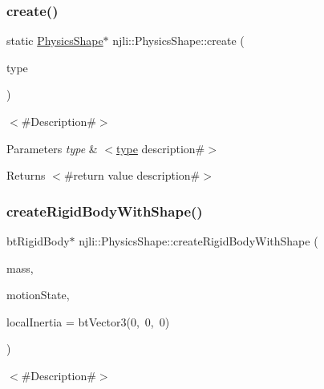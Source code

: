 \subsubsection{\texorpdfstring{create()}{create()}\hspace{0.1cm}{\footnotesize\ttfamily [2/2]}}
{\footnotesize\ttfamily static \mbox{\hyperlink{classnjli_1_1_physics_shape}{Physics\+Shape}}$\ast$ njli\+::\+Physics\+Shape\+::create (\begin{DoxyParamCaption}\item[{\mbox{\hyperlink{_util_8h_a10e94b422ef0c20dcdec20d31a1f5049}{u32}}}]{type }\end{DoxyParamCaption})\hspace{0.3cm}{\ttfamily [static]}}

$<$\#\+Description\#$>$


\begin{DoxyParams}{Parameters}
{\em type} & $<$\mbox{\hyperlink{classnjli_1_1_physics_shape_a2d21f55f6e742bddb5b5fc44223f96fb}{type}} description\#$>$\\
\hline
\end{DoxyParams}
\begin{DoxyReturn}{Returns}
$<$\#return value description\#$>$ 
\end{DoxyReturn}
\mbox{\label{classnjli_1_1_physics_shape_ab71ebdd73aea0c6ce0a47c9c47284a66}} 
\subsubsection{\texorpdfstring{create\+Rigid\+Body\+With\+Shape()}{createRigidBodyWithShape()}}
{\footnotesize\ttfamily bt\+Rigid\+Body$\ast$ njli\+::\+Physics\+Shape\+::create\+Rigid\+Body\+With\+Shape (\begin{DoxyParamCaption}\item[{\mbox{\hyperlink{_util_8h_a5f6906312a689f27d70e9d086649d3fd}{f32}}}]{mass,  }\item[{bt\+Motion\+State $\ast$}]{motion\+State,  }\item[{const bt\+Vector3 \&}]{local\+Inertia = {\ttfamily btVector3(0,~0,~0)} }\end{DoxyParamCaption})}

$<$\#\+Description\#$>$


